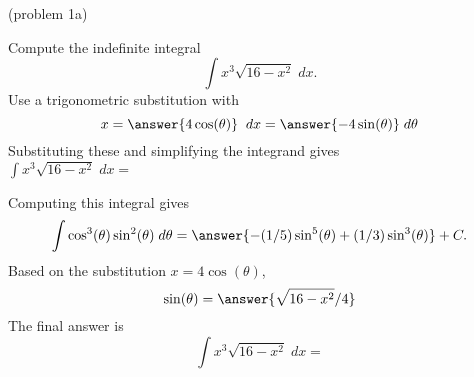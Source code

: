\documentclass[handout]{ximera}
\begin{document}
\begin{problem}(problem 1a)

Compute the indefinite integral
\[
\int   x^3 \sqrt{16-x^2} \; dx.
\]
Use a trigonometric substitution with\\
\[
x = \answer{4\cos(\theta)} \;\; dx = \answer{-4\sin(\theta)} \; d\theta
\]
Substituting these and simplifying the integrand gives\\
$\displaystyle{\int  x^3 \sqrt{16 - x^2}\; dx =}$\\
\begin{multipleChoice}
\end{multipleChoice}

Computing this integral gives
\[
\int \cos^3(\theta)\sin^2(\theta) \; d\theta = \answer{-(1/5)\sin^5(\theta) + (1/3)\sin^3(\theta)} + C.
\]
Based on the substitution $x = 4\cos(\theta)$, \\
\[
\sin(\theta) = \answer{\sqrt{16 - x^2}/4}
\]
The final answer is
\[
\int   x^3\sqrt{16 -  x^2}\; dx = 
\]
\begin{center}
\begin{multipleChoice}
\end{multipleChoice}
\end{center}


\end{problem}
\end{document}
